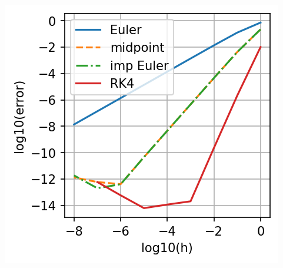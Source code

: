 \documentclass[12pt,letterpaper,noanswers]{exam}
\begin{document}
\includegraphics[]{img/C18error.png}
\end{document}

